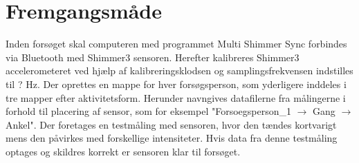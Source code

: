 \section{Fremgangsmåde}
Inden forsøget skal computeren med programmet Multi Shimmer Sync forbindes via Bluetooth med Shimmer3 sensoren. Herefter kalibreres Shimmer3 accelerometeret ved hjælp af kalibreringsklodsen og samplingsfrekvensen indstilles til ? Hz. %
Der oprettes en mappe for hver forsøgsperson, som yderligere inddeles i tre mapper efter aktivitetsform. Herunder navngives datafilerne fra målingerne i forhold til placering af sensor, som for eksempel "Forsoegsperson\_1 $\rightarrow$ Gang $\rightarrow$ Ankel".
Der foretages en testmåling med sensoren, hvor den tændes kortvarigt mens den påvirkes med forskellige intensiteter. Hvis data fra denne testmåling optages og skildres korrekt er sensoren klar til forsøget.

